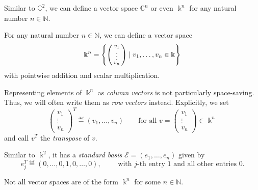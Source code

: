 \documentclass[a4paper, oneside, 12pt]{amsart}
\begin{document}
Similar to \( \mathbb{C}^{2}\), we can define a vector space \( \mathbb{C}^{n}\) or even \(  \Bbbk^{n}\) for any natural number \(n \in \mathbb{N}\).


\begin{example}\label{ex:cn}
  For any  natural number \(n\in \mathbb{N}\), we can define a vector space
  \begin{equation*}
    \Bbbk^n= \left\{\begin{psmallmatrix}  v_{1}\\ \vdots \\ v_{n} \end{psmallmatrix} \mid v_{1}, \dots , v_{n} \in \Bbbk \right\}
  \end{equation*}
  with pointwise addition and scalar multiplication.

  Representing elements of \( \Bbbk^{n}\) as \emph{column vectors} is not particularly space-saving.
  Thus, we will often write them as \emph{row vectors} instead.
  Explicitly, we set
  \begin{equation*}
    \begin{pmatrix}
      v_{1}\\ \vdots \\ v_{n} \end{pmatrix}^{T}
    \eqdef
    ( v_{1}, \dots, v_{n} )\qquad
    \text{for all } v=     \begin{pmatrix}
      v_{1}\\ \vdots \\ v_{n} \end{pmatrix} \in \Bbbk^{n}
  \end{equation*}
  and call \(v^{T}\) the \emph{transpose} of \(v\).


  Similar to \( \Bbbk^{2}\), it has a \emph{standard basis} \( \mathcal{E} = (e_{1}, \dots , e_{n})\) given by
  \begin{equation*}
    e_{j}^{T} \eqdef
    ( 0 , \dots , 0 , 1 , 0 , \dots , 0), \qquad \text{ with \(j\)-th entry \(1\) and all other entries \(0\).}
  \end{equation*}
\end{example}

Not all vector spaces are of the form \( \Bbbk^{n}\) for some \(n\in \mathbb{N}\).
\end{document}
